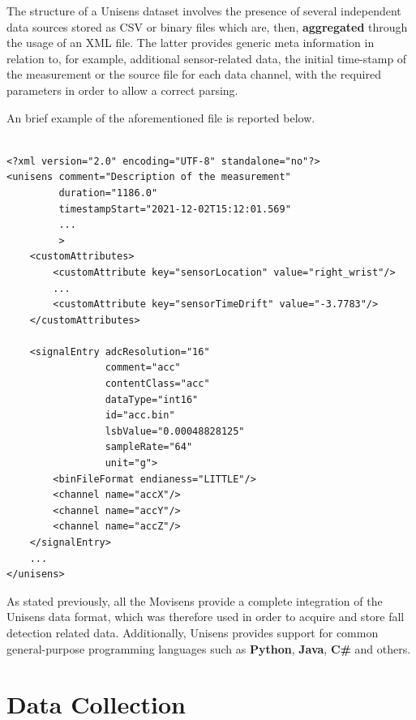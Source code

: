 The structure of a Unisens dataset involves the presence of several independent data sources stored as CSV or binary files which are, then, \textbf{aggregated} through the usage of an XML file. The latter provides generic meta information in relation to, for example, additional sensor-related data, the initial time-stamp of the measurement or the source file for each data channel, with the required parameters in order to allow a correct parsing.

An brief example of the aforementioned file is reported below.

\begin{verbatim}

<?xml version="2.0" encoding="UTF-8" standalone="no"?>
<unisens comment="Description of the measurement" 
         duration="1186.0"
         timestampStart="2021-12-02T15:12:01.569"
         ...
         >
    <customAttributes>
        <customAttribute key="sensorLocation" value="right_wrist"/>
        ...
        <customAttribute key="sensorTimeDrift" value="-3.7783"/>
    </customAttributes>

    <signalEntry adcResolution="16"
                 comment="acc"
                 contentClass="acc"
                 dataType="int16"
                 id="acc.bin"
                 lsbValue="0.00048828125"
                 sampleRate="64"
                 unit="g">
        <binFileFormat endianess="LITTLE"/>
        <channel name="accX"/>
        <channel name="accY"/>
        <channel name="accZ"/>
    </signalEntry>
    ...
</unisens>
\end{verbatim}

As stated previously, all the Movisens provide a complete integration of the Unisens data format, which was therefore used in order to acquire and store fall detection related data. Additionally, Unisens provides support for common general-purpose programming languages such as \textbf{Python}, \textbf{Java}, \textbf{C\#} and others.

\section{Data Collection}\label{sec:edamove4-data-collection}




